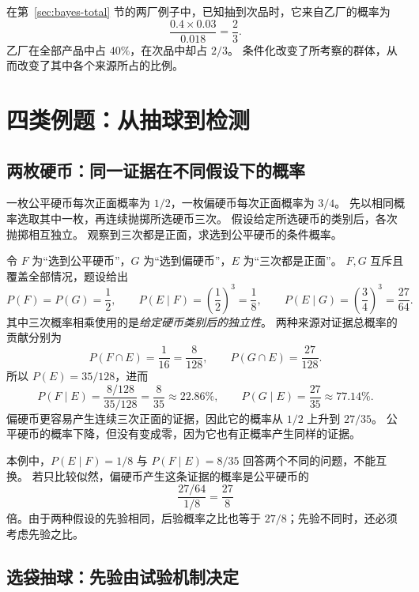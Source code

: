 \documentclass[UTF8,12pt,a4paper,fontset=fandol]{ctexart}
\begin{document}
在第~\ref{sec:bayes-total} 节的两厂例子中，已知抽到次品时，它来自乙厂的概率为
\[
  \frac{0.4\times0.03}{0.018}=\frac23.
\]
乙厂在全部产品中占 $40\%$，在次品中却占 $2/3$。
条件化改变了所考察的群体，从而改变了其中各个来源所占的比例。

\section{四类例题：从抽球到检测}
\label{sec:bayes-examples}

\subsection{两枚硬币：同一证据在不同假设下的概率}

\begin{example}[连续三次正面之后的硬币类别]
\label{ex:bayes-coins}
一枚公平硬币每次正面概率为 $1/2$，一枚偏硬币每次正面概率为 $3/4$。
先以相同概率选取其中一枚，再连续抛掷所选硬币三次。
假设给定所选硬币的类别后，各次抛掷相互独立。
观察到三次都是正面，求选到公平硬币的条件概率。
\end{example}
\begin{solve}
令 $F$ 为“选到公平硬币”，$G$ 为“选到偏硬币”，$E$ 为“三次都是正面”。
$F,G$ 互斥且覆盖全部情况，题设给出
\[
  P(F)=P(G)=\frac12,\qquad
  P(E\mid F)=\left(\frac12\right)^3=\frac18,\qquad
  P(E\mid G)=\left(\frac34\right)^3=\frac{27}{64}.
\]
其中三次概率相乘使用的是\emph{给定硬币类别后的独立性}。
两种来源对证据总概率的贡献分别为
\[
  P(F\cap E)=\frac1{16}=\frac8{128},\qquad
  P(G\cap E)=\frac{27}{128}.
\]
所以 $P(E)=35/128$，进而
\begin{equation}
  P(F\mid E)=\frac{8/128}{35/128}=\frac8{35}\approx22.86\%,
  \qquad
  P(G\mid E)=\frac{27}{35}\approx77.14\%.
  \label{eq:bayes-coins-result}
\end{equation}
偏硬币更容易产生连续三次正面的证据，因此它的概率从 $1/2$ 上升到 $27/35$。
公平硬币的概率下降，但没有变成零，因为它也有正概率产生同样的证据。
\end{solve}

本例中，$P(E\mid F)=1/8$ 与 $P(F\mid E)=8/35$ 回答两个不同的问题，不能互换。
若只比较似然，偏硬币产生这条证据的概率是公平硬币的
\[
  \frac{27/64}{1/8}=\frac{27}{8}
\]
倍。由于两种假设的先验相同，后验概率之比也等于 $27/8$；先验不同时，还必须考虑先验之比。

\subsection{选袋抽球：先验由试验机制决定}
\end{document}
